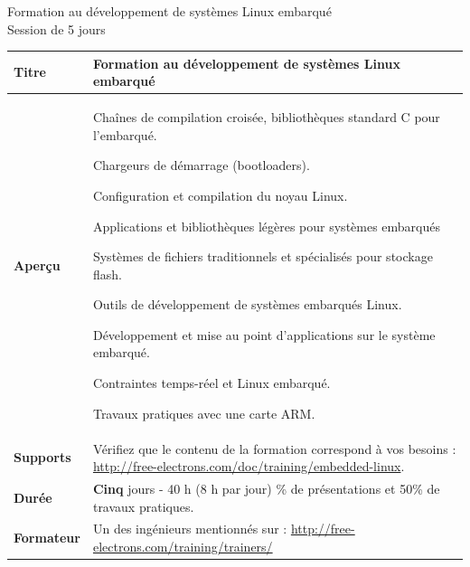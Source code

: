 \documentclass[a4paper,12pt,obeyspaces,spaces,hyphens]{article}
\begin{document}
\thispagestyle{fancy}

\setlength{\arrayrulewidth}{0.8pt}

\begin{center}
\LARGE
Formation au développement de systèmes Linux embarqué\\
\large
Session de 5 jours
\end{center}
\vspace{1cm}

\small
{}

 {
  \begin{tabularx}{\textwidth}{|g|h|}
    {\bf Titre} & {\bf Formation au développement de systèmes Linux embarqué} \\
    \hline

    {\bf Aperçu} &
Chaînes de compilation croisée, bibliothèques standard C pour l'embarqué. \par
Chargeurs de démarrage (bootloaders). \par
Configuration et compilation du noyau Linux. \par
Applications et bibliothèques légères pour systèmes embarqués \par
Systèmes de fichiers traditionnels et spécialisés pour stockage flash. \par
Outils de développement de systèmes embarqués Linux. \par
Développement et mise au point d'applications sur le système embarqué. \par
Contraintes temps-réel et Linux embarqué. \par
Travaux pratiques avec une carte ARM. \\
    \hline
    {\bf Supports} &
    Vérifiez que le contenu de la formation correspond à vos besoins :
    \newline \url{http://free-electrons.com/doc/training/embedded-linux}. \\
    \hline

    {\bf Durée} & {\bf Cinq} jours - 40 h (8 h par jour)
    \% de présentations et 50\% de travaux pratiques. \\
    \hline

    {\bf Formateur} & Un des ingénieurs mentionnés sur :
    \newline \url{http://free-electrons.com/training/trainers/}\\
    \hline


\end{tabularx}}
\end{document}
